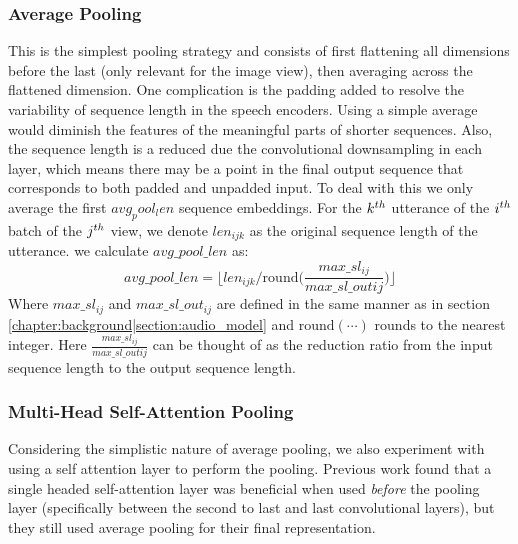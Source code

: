\subsubsection{Average Pooling}
\label{section:average_pooling}
This is the simplest pooling strategy and consists of first flattening all dimensions before the last (only relevant for the image view), then averaging across the flattened dimension.
One complication is the padding added to resolve the variability of sequence length in the speech encoders.
Using a simple average would diminish the features of the meaningful parts of shorter sequences.
Also, the sequence length is a reduced due the convolutional downsampling in each layer, which means there may be a point in the final output sequence that corresponds to both padded and unpadded input.
To deal with this we only average the first $avg_pool_len$ sequence embeddings. 
For the $k^{th}$ utterance of the  $i^{th}$ batch of the $j^{th}$ view, we denote $len_{ijk}$ as the original sequence length of the utterance. 
we calculate $avg\_pool\_len$ as:
\begin{equation*}
    avg\_pool\_len = \lfloor  len_{ijk} / \text{round}\Big( \frac{max\_sl_{ij}}{max\_sl\_out{ij}} \Big) \rfloor
\end{equation*}
Where $max\_sl_{ij}$ and $max\_sl\_out_{ij}$ are defined in the same manner as in section \ref{chapter:background|section:audio_model} and $\text{round}(\cdots)$ rounds to the nearest integer.
Here $\frac{max\_sl_{ij}}{max\_sl\_out{ij}}$ can be thought of as the reduction ratio from the input sequence length to the output sequence length.

\subsubsection{Multi-Head Self-Attention Pooling}
\label{section:mh_attn_pooling}
Considering the simplistic nature of average pooling, we also experiment with using a self attention layer to perform the pooling.
Previous work \cite{ohishi2020trilingual} found that a single headed self-attention layer was beneficial when used \textit{before} the pooling layer (specifically between the second to last and last convolutional layers), but they still used average pooling for their final representation.

